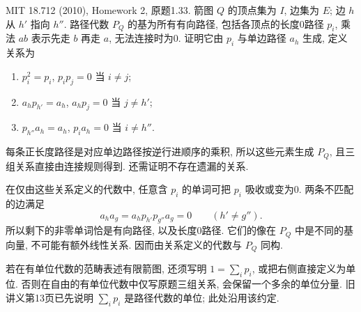 \begin{exercise}\label{hw:1.33}
MIT 18.712 (2010), Homework 2, 原题1.33. 箭图 $Q$ 的顶点集为 $I$, 边集为 $E$; 边 $h$ 从 $h'$ 指向 $h''$. 路径代数 $P_Q$ 的基为所有有向路径, 包括各顶点的长度0路径 $p_i$, 乘法 $ab$ 表示先走 $b$ 再走 $a$, 无法连接时为0. 证明它由 $p_i$ 与单边路径 $a_h$ 生成, 定义关系为
\begin{enumerate}[label=\arabic*.]
\item $p_i^2=p_i$, $p_ip_j=0$ 当 $i\ne j$;
\item $a_hp_{h'}=a_h$, $a_hp_j=0$ 当 $j\ne h'$;
\item $p_{h''}a_h=a_h$, $p_i a_h=0$ 当 $i\ne h''$.
\end{enumerate}
\end{exercise}
\begin{solution}
每条正长度路径是对应单边路径按逆行进顺序的乘积, 所以这些元素生成 $P_Q$, 且三组关系直接由连接规则得到. 还需证明不存在遗漏的关系.

在仅由这些关系定义的代数中, 任意含 $p_i$ 的单词可把 $p_i$ 吸收或变为0. 两条不匹配的边满足
\[
a_h a_g=a_h p_{h'}p_{g''}a_g=0\qquad(h'\ne g'').
\]
所以剩下的非零单词恰是有向路径, 以及长度0路径. 它们的像在 $P_Q$ 中是不同的基向量, 不可能有额外线性关系. 因而由关系定义的代数与 $P_Q$ 同构.

若在有单位代数的范畴表述有限箭图, 还须写明 $1=\sum_i p_i$, 或把右侧直接定义为单位. 否则在自由的有单位代数中仅写原题三组关系, 会保留一个多余的单位分量. 旧讲义第13页已先说明 $\sum_i p_i$ 是路径代数的单位; 此处沿用该约定.
\end{solution}

